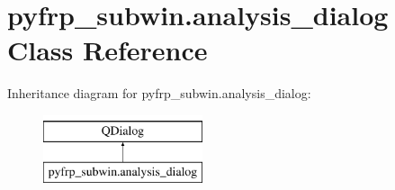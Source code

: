 \hypertarget{classpyfrp__subwin_1_1analysis__dialog}{\section{pyfrp\+\_\+subwin.\+analysis\+\_\+dialog Class Reference}
\label{classpyfrp__subwin_1_1analysis__dialog}
}
Inheritance diagram for pyfrp\+\_\+subwin.\+analysis\+\_\+dialog\+:\begin{figure}[H]
\begin{center}
\leavevmode
\includegraphics[height=2.000000cm]{classpyfrp__subwin_1_1analysis__dialog}
\end{center}
\end{figure}
